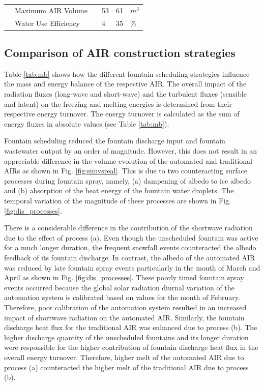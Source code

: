 \documentclass[tc, manuscript]{copernicus}
\begin{document}
\begin{table}
\begin{tabular}{@{}|llllll|@{}}
		                       & Maximum AIR Volume              &                 & 53            & 61            & $m^{3}$ \\
		\multicolumn{1}{|l|}{} & Water Use Efficiency            &                 & 4             & 35            & \% \\\midrule
	\end{tabular}
\end{table}

\subsection{Comparison of AIR construction strategies}

Table \ref{tab:mb} shows how the different fountain scheduling strategies influence the mass and energy balance
of the respective AIR.  The overall impact of the radiation fluxes (long-wave and short-wave) and the
turbulent fluxes (sensible and latent) on the freezing and melting energies is determined from their respective
energy turnover. The energy turnover is calculated as the sum of energy fluxes in absolute values (see Table
\ref{tab:mb}). 

Fountain scheduling reduced the fountain discharge input and fountain wastewater output by an order of
magnitude. However, this does not result in an appreciable difference in the volume evolution of the automated
and traditional AIRs as shown in Fig. \ref{fig:simvsreal}. This is due to two counteracting surface processes
during fountain spray, namely, (a) dampening of albedo to ice albedo and (b) absorption of the heat energy of
the fountain water droplets. The temporal variation of the magnitude of these processes are shown in Fig.
\ref{fig:dis_processes}.

There is a considerable difference in the contribution of the shortwave radiation due to the effect of process
(a). Even though the unscheduled fountain was active for a much longer duration, the frequent snowfall events
counteracted the albedo feedback of its fountain discharge. In contrast, the albedo of the automated AIR was
reduced by late fountain spray events particularly in the month of March and April as shown in Fig.
\ref{fig:dis_processes}. These poorly timed fountain spray events occurred because the global solar radiation
diurnal variation of the automation system is calibrated based on values for the month of February. Therefore,
poor calibration of the automation system resulted in an increased impact of shortwave radiation on the
automated AIR. Similarly, the fountain discharge heat flux for the traditional AIR was enhanced due to process
(b). The higher discharge quantity of the unscheduled fountains and its longer duration were responsible for the
higher contribution of fountain discharge heat flux in the overall energy turnover. Therefore, higher melt of
the automated AIR due to process (a) counteracted the higher melt of the traditional AIR due to process (b).
\end{document}
